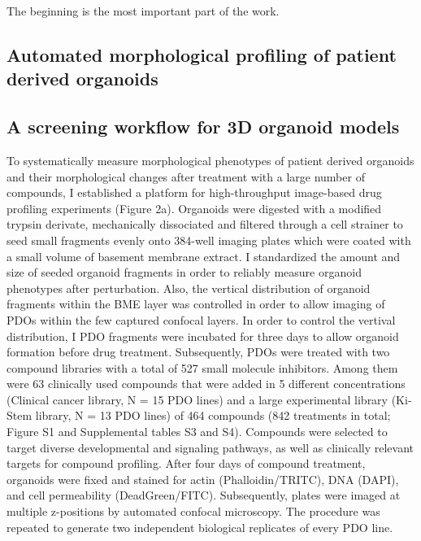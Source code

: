 \begin{savequote}[75mm]
The beginning is the most important part of the work.
\end{savequote}

\begin{flushleft}
\chapter{Automated morphological profiling of patient derived organoids}

\section{A screening workflow for 3D organoid models}
To systematically measure morphological phenotypes of patient derived organoids and their morphological changes after treatment with a large number of compounds, I established a platform for high-throughput image-based drug profiling experiments (Figure 2a). Organoids were digested with a modified trypsin derivate, mechanically dissociated and filtered through a cell strainer to seed small fragments evenly onto 384-well imaging plates which were coated with a small volume of basement membrane extract. I standardized the amount and size of seeded organoid fragments in order to reliably measure organoid phenotypes after perturbation.
Also, the vertical distribution of organoid fragments within the BME layer was controlled in order to allow imaging of PDOs within the few captured confocal layers. In order to control the vertival distribution, I 
PDO fragments were incubated for three days to allow organoid formation before drug treatment. 
Subsequently, PDOs were treated with two compound libraries with a total of 527 small molecule inhibitors. Among them were 63 clinically used compounds that were added in 5 different concentrations (Clinical cancer library, N = 15 PDO lines) and a large experimental library (Ki-Stem library, N = 13 PDO lines) of 464 compounds (842 treatments in total; Figure S1 and Supplemental tables S3 and S4). 
Compounds were selected to target diverse developmental and signaling pathways, as well as clinically relevant targets for compound profiling. 
After four days of compound treatment, organoids were fixed and stained for actin (Phalloidin/TRITC), DNA (DAPI), and cell permeability (DeadGreen/FITC). Subsequently, plates were imaged at multiple z-positions by automated confocal microscopy. The procedure was repeated to generate two independent biological replicates of every PDO line.



\end{flushleft}
